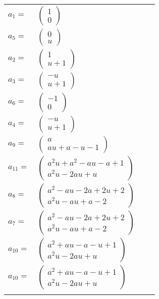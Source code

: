 \documentclass[1p]{elsarticle_modified}
\theoremstyle{definition}
\begin{document}
\begin{tabular}{m{7pt} m{180pt} m{7pt} m{180pt} }
\flushright $a_{1}=$&$\begin{pmatrix}1\\0\end{pmatrix}$ \\
\flushright $a_{5}=$&$\begin{pmatrix}0\\u\end{pmatrix}$ \\
\flushright $a_{2}=$&$\begin{pmatrix}1\\u+1\end{pmatrix}$ \\
\flushright $a_{3}=$&$\begin{pmatrix}- u\\u+1\end{pmatrix}$ \\
\flushright $a_{6}=$&$\begin{pmatrix}-1\\0\end{pmatrix}$ \\
\flushright $a_{4}=$&$\begin{pmatrix}- u\\u+1\end{pmatrix}$ \\
\flushright $a_{9}=$&$\begin{pmatrix}a\\a u+a- u-1\end{pmatrix}$ \\
\flushright $a_{11}=$&$\begin{pmatrix}a^2 u+a^2- a u- a+1\\a^2 u-2 a u+u\end{pmatrix}$ \\
\flushright $a_{8}=$&$\begin{pmatrix}a^2- a u-2 a+2 u+2\\a^2 u- a u+a-2\end{pmatrix}$ \\
\flushright $a_{7}=$&$\begin{pmatrix}a^2- a u-2 a+2 u+2\\a^2 u- a u+a-2\end{pmatrix}$ \\
\flushright $a_{10}=$&$\begin{pmatrix}a^2+a u- a- u+1\\a^2 u-2 a u+u\end{pmatrix}$\\ \flushright $a_{10}=$&$\begin{pmatrix}a^2+a u- a- u+1\\a^2 u-2 a u+u\end{pmatrix}$\\&\end{tabular}
\end{document}
